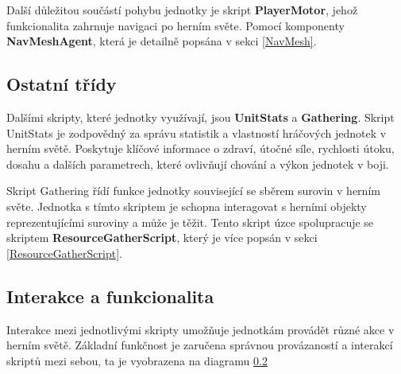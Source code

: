 Další důležitou součástí pohybu jednotky je skript \textbf{PlayerMotor}, jehož funkcionalita zahrnuje navigaci po herním světe. Pomocí komponenty \textbf{NavMeshAgent}, která je detailně popsána v sekci \ref{NavMesh}.

\subsection{Ostatní třídy}
Dalšími skripty, které jednotky využívají, jsou \textbf{UnitStats} a \textbf{Gathering}. Skript UnitStats je zodpovědný za správu statistik a vlastností hráčových jednotek v herním světě. Poskytuje klíčové informace o zdraví, útočné síle, rychlosti útoku, dosahu a dalších parametrech, které ovlivňují chování a výkon jednotek v boji. 

Skript Gathering řídí funkce jednotky související se sběrem surovin v herním světe. Jednotka s tímto skriptem je schopna interagovat s herními objekty reprezentujícími suroviny a může je těžit. Tento skript úzce spolupracuje se skriptem \textbf{ResourceGatherScript}, který je více popsán v sekci \ref{ResourceGatherScript}.

\subsection{Interakce a funkcionalita}
Interakce mezi jednotlivými skripty umožňuje jednotkám provádět různé akce v herním světě. Základní funkčnost je zaručena správnou provázaností a interakcí skriptů mezi sebou, ta je vyobrazena na diagramu \ref{}

